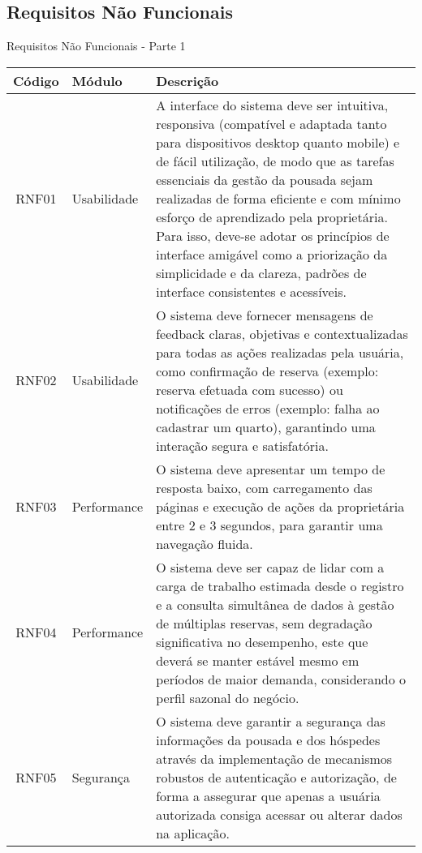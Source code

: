 \documentclass[
	12pt,				%
	openany,			%
	twoside,			%
	a4paper,			%
	english,			%
	french,				%
	spanish,			%
	brazil				%
	]{abntex2}
\begin{document}
\subsection{Requisitos Não Funcionais}
\begin{quadro}[H]
	\caption{\label{quadro_rnf1}Requisitos Não Funcionais - Parte 1}
	\begin{tabular}{|c|p{4cm}|p{8cm}|}
		\hline
		\textbf{Código} & \textbf{Módulo} & \textbf{Descrição} \\ \hline
		RNF01 & Usabilidade & A interface do sistema deve ser intuitiva, responsiva (compatível e adaptada tanto para dispositivos desktop quanto mobile) e de fácil utilização, de modo que as tarefas essenciais da gestão da pousada sejam realizadas de forma eficiente e com mínimo esforço de aprendizado pela proprietária. Para isso, deve-se adotar os princípios de interface amigável como a priorização da simplicidade e da clareza, padrões de interface consistentes e acessíveis. \\ \hline
		RNF02 & Usabilidade & O sistema deve fornecer mensagens de feedback claras, objetivas e contextualizadas para todas as ações realizadas pela usuária, como confirmação de reserva (exemplo: reserva efetuada com sucesso) ou notificações de erros (exemplo: falha ao cadastrar um quarto), garantindo uma interação segura e satisfatória. \\ \hline
		RNF03 & Performance & O sistema deve apresentar um tempo de resposta baixo, com carregamento das páginas e execução de ações da proprietária entre 2 e 3 segundos, para garantir uma navegação fluida. \\ \hline
		RNF04 & Performance & O sistema deve ser capaz de lidar com a carga de trabalho estimada desde o registro e a consulta simultânea de dados à gestão de múltiplas reservas, sem degradação significativa no desempenho, este que deverá se manter estável mesmo em períodos de maior demanda, considerando o perfil sazonal do negócio. \\ \hline
		RNF05 & Segurança & O sistema deve garantir a segurança das informações da pousada e dos hóspedes através da implementação de mecanismos robustos de autenticação e autorização, de forma a assegurar que apenas a usuária autorizada consiga acessar ou alterar dados na aplicação. \\ \hline
	
	\end{tabular}
\end{quadro}
\end{document}
